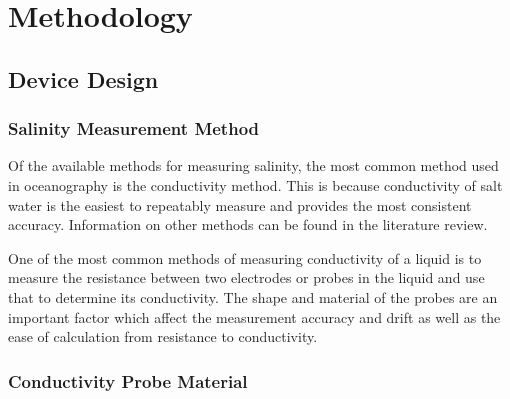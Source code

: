 
\chapter{Methodology}\label{ch:methodology}

\section{Device Design}

\subsection{Salinity Measurement Method}

Of the available methods for measuring salinity, the most common method used in oceanography is the conductivity method.
This is because conductivity of salt water is the easiest to repeatably measure and provides the most consistent accuracy.
Information on other methods can be found in the literature review.

One of the most common methods of measuring conductivity of a liquid is to measure the resistance between two electrodes or probes in the liquid and use that to determine its conductivity.
The shape and material of the probes are an important factor which affect the measurement accuracy and drift as well as the ease of calculation from resistance to conductivity.

\subsection{Conductivity Probe Material}

